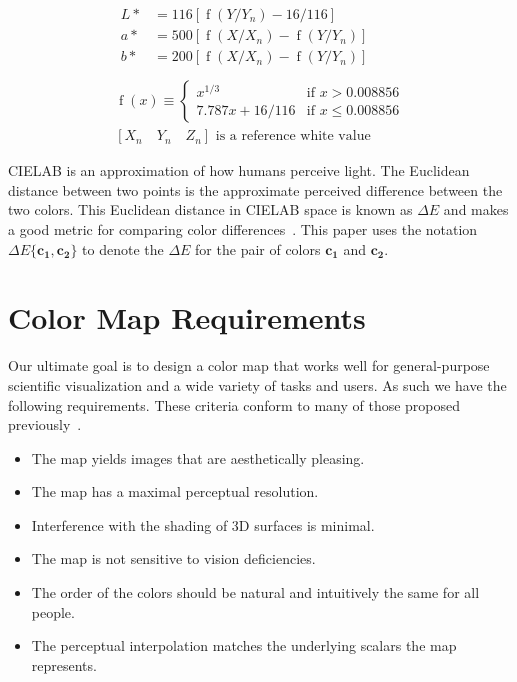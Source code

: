 \documentclass{acmsiggraph}               %
\newcommand{\lcite}[1]{~\cite{#1}}
\newcommand{\Lab}{CIELAB\xspace}
\newcommand{\DeltaE}{\ensuremath{\Delta{}E}\xspace}
\newcommand*{\cvec}[1]{\mathbf{#1}}
\begin{document}
\begin{equation}
  \begin{gathered}
    \begin{aligned}
      L* &= 116 \left[ \operatorname{f}(Y/Y_n) - 16/116 \right] \\
      a* &=
        500 \left[ \operatorname{f}(X/X_n) - \operatorname{f}(Y/Y_n) \right] \\
      b* &=
        200 \left[ \operatorname{f}(X/X_n) - \operatorname{f}(Y/Y_n) \right] \\
    \end{aligned} \\
    \operatorname{f}(x) \equiv
    \begin{cases}
      x^{1/3}          & \text{if $x > 0.008856$} \\
      7.787 x + 16/116 & \text{if $x \leq 0.008856$}
    \end{cases} \\
    [X_n \quad Y_n \quad Z_n] \text{ is a reference white value}
  \end{gathered}
  \label{eqn:xyz2lab}
\end{equation}

\Lab is an approximation of how humans perceive light.  The Euclidean
distance between two points is the approximate perceived difference between
the two colors.  This Euclidean distance in \Lab space is known as \DeltaE
and makes a good metric for comparing color differences\lcite{Wyszecki82}.
This paper uses the notation $\DeltaE\{\cvec{c_1},\cvec{c_2}\}$ to denote
the \DeltaE for the pair of colors $\cvec{c_1}$ and $\cvec{c_2}$.


\section{Color Map Requirements}
\label{sec:ColorMapRequirements}

Our ultimate goal is to design a color map that works well for
general-purpose scientific visualization and a wide
variety of tasks and users.  As such we have the following requirements.
These criteria conform to many of those proposed
previously\lcite{Fortner97,Levkowitz92,Light04}.

\begin{itemize}
\item The map yields images that are aesthetically pleasing.
\item The map has a maximal perceptual resolution.
\item Interference with the shading of 3D surfaces is minimal.
\item The map is not sensitive to vision deficiencies.
\item The order of the colors should be natural and intuitively the same
  for all people.
\item The perceptual interpolation matches the underlying scalars the map
  represents.
\end{itemize}
\end{document}
